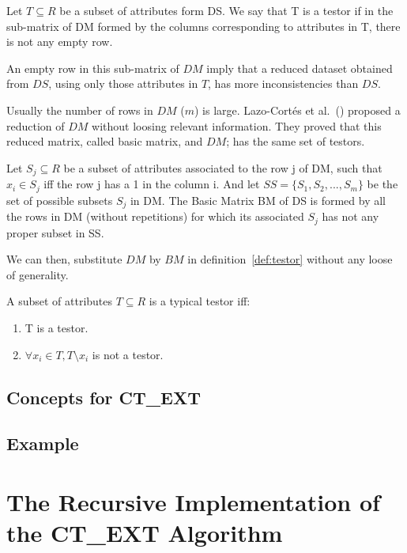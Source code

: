 \documentclass[citeauthoryear]{llncs}
\begin{document}
	\begin{definition}\label{def:testor}
		Let $T \subseteq R$ be a subset of attributes form DS. We say that T is a testor if in the sub-matrix
		of DM formed by the columns corresponding to attributes in T, there is not any empty row.
	\end{definition}
	
	An empty row in this sub-matrix of $DM$ imply that a reduced dataset obtained from $DS$, using only those 
	attributes in $T$, has more inconsistencies than $DS$. 
	
	Usually the number of rows in $DM$ ($m$) is large. Lazo-Cort\'es et al.~(\cite{Lazo2001}) proposed a reduction
	of $DM$ without loosing relevant information. They proved that this reduced matrix, called basic matrix, and
	$DM$; has the same set of testors. 
	
	\begin{definition} \label{def:BM}
		Let $S_{j} \subseteq R$ be a subset of attributes associated to the row j of DM, such that $x_i \in S_{j}$
		iff the row j has a 1 in the column i. And let $SS=\lbrace S_1, S_2,...,S_m  \rbrace$ be the set of possible
		subsets $S_{j}$ in DM. The Basic Matrix BM of DS is formed by all the rows in DM (without repetitions) for 
		which its associated $S_{j}$ has not any proper subset in SS.
	\end{definition}
	
	We can then, substitute $DM$ by $BM$ in definition~\ref{def:testor} without 
	any loose of generality.
	
	\begin{definition}\label{def:TT}
		A subset of attributes $T \subseteq R$ is a typical testor iff:
		\begin{enumerate}
		\item T is a testor.
		\item $\forall x_i \in T, T \setminus x_i$ is not a testor. 
		\end{enumerate}
	\end{definition}	
	
\subsection{Concepts for CT\_EXT}
	

\subsection{Example}
%
\section{The Recursive Implementation of the CT\_EXT Algorithm}
%
\end{document}
